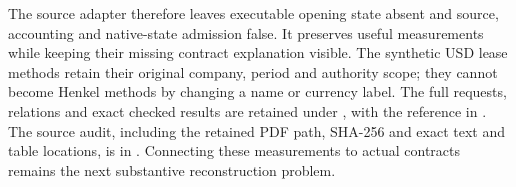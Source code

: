 The source adapter therefore leaves executable opening state absent and source,
accounting and native-state admission false. It preserves useful measurements
while keeping their missing contract explanation visible. The synthetic USD
lease methods retain their original company, period and authority scope; they
cannot become Henkel methods by changing a name or currency label. The full
requests, relations and exact checked results are retained under
, with the
reference in . The source audit,
including the retained PDF path, SHA-256 and exact text and table locations,
is in . Connecting these
measurements to actual contracts remains the next substantive reconstruction
problem.
